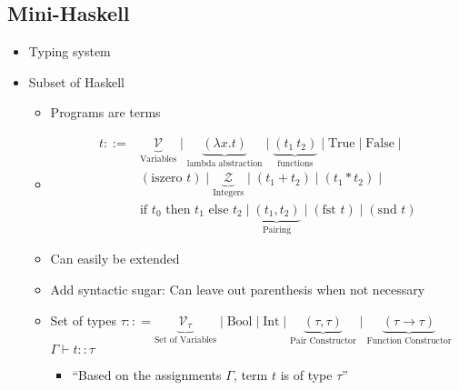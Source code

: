 \subsection{Mini-Haskell}
\begin{itemize}
    \item Typing system
    \item Subset of Haskell
        \begin{itemize}
            \item Programs are terms
            \item
\begin{align*}
    t ::=& \underbrace{\mathcal{V}}_{\text{Variables}} \mid \underbrace{(\lambda x.t)}_{\text{lambda abstraction}} \mid \underbrace{(t_1 \ t_2)}_{\text{functions}} \mid \text{True} \mid \text{False} \mid \\
         & (\text{iszero } t) \mid \underbrace{\mathcal{Z}}_{\text{Integers}} \mid (t_1 + t_2) \mid (t_1 * t_2) \mid\\
         & \text{if } t_0 \text{ then } t_1 \text{ else } t_2 \mid \underbrace{(t_1, t_2)}_{\text{Pairing}} \mid (\text{fst } t) \mid (\text{snd } t)
\end{align*}
            \item Can easily be extended
            \item Add syntactic sugar: Can leave out parenthesis when not necessary
        \end{itemize}
        \begin{itemize}
            \item Set of types $\tau :: = \underbrace{\mathcal{V}_{\tau}}_{\text{Set of Variables}} \mid \text{Bool} \mid \text{Int} \mid \underbrace{(\tau, \tau)}_{\text{Pair Constructor}} \mid \underbrace{(\tau \to \tau)}_{\text{Function Constructor}}$
             $\Gamma \vdash t :: \tau$
                \begin{itemize}
                    \ides{$\Gamma$:} Set of bindings mappings from variables to types)
                     Term
                    \ides{$\tau$:} Type
                    \item ``Based on the assignments $\Gamma$, term $t$ is of type $\tau$''
                \end{itemize}
        \end{itemize}
        \begin{itemize}

\end{itemize}
\end{itemize}
